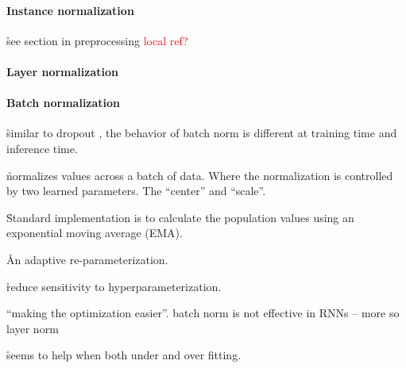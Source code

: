 \paragraph{Instance normalization}

\r{see section in preprocessing \textcolor{red}{local ref?}}

\paragraph{Layer normalization}


\paragraph{Batch normalization}




\r{similar to dropout \ALR, the behavior of batch norm is different at training time and inference time.}

\r{normalizes values across a batch of data. Where the normalization is controlled by two learned parameters. The ``center'' and ``scale''.}

\r{Standard implementation is to calculate the population values using an exponential moving average (EMA).}



\r{An adaptive re-parameterization.}

\r{reduce sensitivity to hyperparameterization.}


\r{``making the optimization easier''. batch norm is not effective in RNNs -- more so layer norm}

\r{seems to help when both under and over fitting.}

